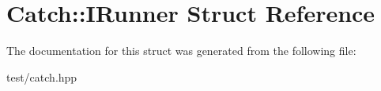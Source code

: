 \hypertarget{structCatch_1_1IRunner}{}\section{Catch\+:\+:I\+Runner Struct Reference}
\label{structCatch_1_1IRunner}


The documentation for this struct was generated from the following file\+:\begin{DoxyCompactItemize}
\item 
test/catch.\+hpp\end{DoxyCompactItemize}
